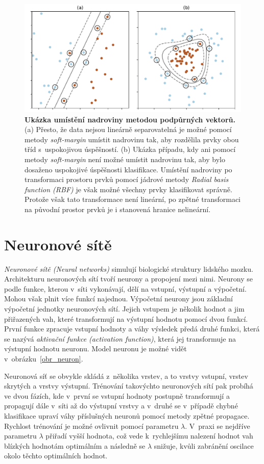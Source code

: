 \begin{figure}[h]
    \centering
    \includegraphics[width=\textwidth]{obrazky/svm.pdf}
    \caption{\textbf{Ukázka umístění nadroviny metodou podpůrných vektorů.} (a) Přesto, že data nejsou lineárně separovatelná je možné pomocí metody \textit{soft-margin} umístit nadrovinu tak, aby rozdělila prvky obou tříd s~uspokojivou úspěšností. (b) Ukázka případu, kdy ani pomocí metody \textit{soft-margin} není možné umístit nadrovinu tak, aby bylo dosaženo uspokojivé úspěšnosti klasifikace. Umístění nadroviny po transformaci prostoru prvků pomocí jádrové metody \textit{Radial basis function (RBF)} je však možné všechny prvky klasifikovat správně. Protože však tato transformace není lineární, po zpětné transformaci na původní prostor prvků je i stanovená hranice nelineární.}
    \label{obr_svm}
\end{figure}

\section{Neuronové sítě}
\label{neuronove_site}
\textit{Neuronové sítě (Neural networks)} simulují biologické struktury lidského mozku. Architekturu neuronových sítí tvoří neurony a propojení mezi nimi. Neurony se podle funkce, kterou v~síti vykonávají, dělí na vstupní, výstupní a výpočetní. Mohou však plnit více funkcí najednou. Výpočetní neurony jsou základní výpočetní jednotky neuronových sítí. Jejich vstupem je několik hodnot a jim přiřazených vah, které transformují na výstupní hodnotu pomocí dvou funkcí. První funkce zpracuje vstupní hodnoty a váhy výsledek předá druhé funkci, která se nazývá \textit{aktivační funkce (activation function)}, která jej transformuje na výstupní hodnotu neuronu. Model neuronu je možné vidět v~obrázku~\ref{obr_neuron}.\cite{data_classification}\cite{machine_learning}

Neuronová síť se obvykle skládá z~několika vrstev, a to vrstvy vstupní, vrstev skrytých a vrstvy výstupní. Trénování takovýchto neuronových sítí pak probíhá ve dvou fázích, kde v~první se vstupní hodnoty postupně transformují a propagují dále v~síti až do výstupní vrstvy a v~druhé se v~případě chybné klasifikace upraví váhy příslušných neuronů pomocí metody zpětné propagace. Rychlost trénování je možné ovlivnit pomocí parametru $\lambda$. V~praxi se nejdříve parametru $\lambda$ přiřadí vyšší hodnota, což vede k~rychlejšímu nalezení hodnot vah blízkých hodnotám optimálním a následně se $\lambda$ snižuje, kvůli zabránění oscilace okolo těchto optimálních hodnot.\cite{data_classification}\cite{machine_learning}

